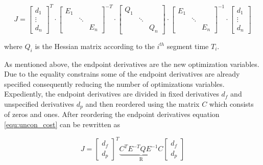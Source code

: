 \begin{equation}
J =
\begin{bmatrix}
   d_1 \\
\vdots \\
  d_n
\end{bmatrix}^T
\cdot
\begin{bmatrix}
   E_1 &  &  \\
    & \ddots &  \\
   & & E_n
\end{bmatrix} ^{-T}
\cdot
\begin{bmatrix}
   Q_1 &  &  \\
    & \ddots &  \\
   & & Q_n
\end{bmatrix} 
\cdot
\begin{bmatrix}
   E_1 &  &  \\
    & \ddots &  \\
   & & E_n
\end{bmatrix} ^{-1}
\cdot
\begin{bmatrix}
   d_1 \\
\vdots \\
  d_n
\end{bmatrix}
\label{equ:uncon_cost}
\end{equation}

where $Q_i$ is the Hessian matrix according to the $i^{th}$ segment time $T_i$.\newline

As mentioned above, the endpoint derivatives are the new optimization variables. Due to the equality constrains some of the endpoint derivatives are already specified consequently reducing the number of optimizations variables. Expediently, the endpoint derivatives are divided in fixed derivatives $d_f$ and unspecified derivatives $d_p$ and then reordered using the matrix $C$ which consists of zeros and ones. After reordering the endpoint derivatives equation \ref{equ:uncon_cost} can be rewritten as

\begin{equation}
J =
\begin{bmatrix}
   d_f \\
  d_p
\end{bmatrix}^T
\underbrace{C^T E^{-T} Q E^{-1} C}_\text{R}
\begin{bmatrix}
   d_f \\
  d_p
\end{bmatrix}
\label{equ:R_cost}
\end{equation}

